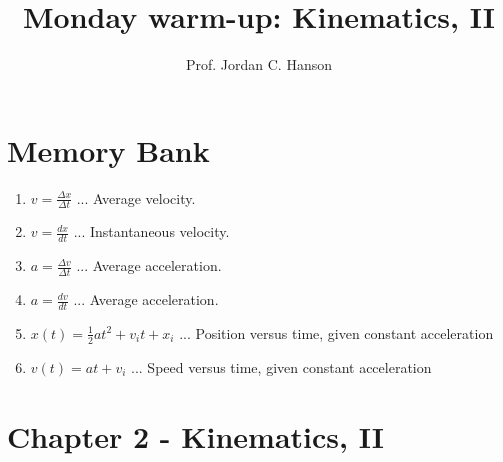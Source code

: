 \documentclass{article}
\begin{document}
\twocolumn

\title{Monday warm-up: Kinematics, II}
\author{Prof. Jordan C. Hanson}

\maketitle

\section{Memory Bank}

\begin{enumerate}
\item $v = \frac{\Delta x}{\Delta t}$ ... Average velocity.
\item $v = \frac{dx}{dt}$ ... Instantaneous velocity.
\item $a = \frac{\Delta v}{\Delta t}$ ... Average acceleration.
\item $a = \frac{dv}{dt}$ ... Average acceleration.
\item $x(t) = \frac{1}{2}at^2 + v_i t + x_i$ ... Position versus time, given constant acceleration
\item $v(t) = at + v_i$ ... Speed versus time, given constant acceleration
\end{enumerate}

\section{Chapter 2 - Kinematics, II}
\end{document}

